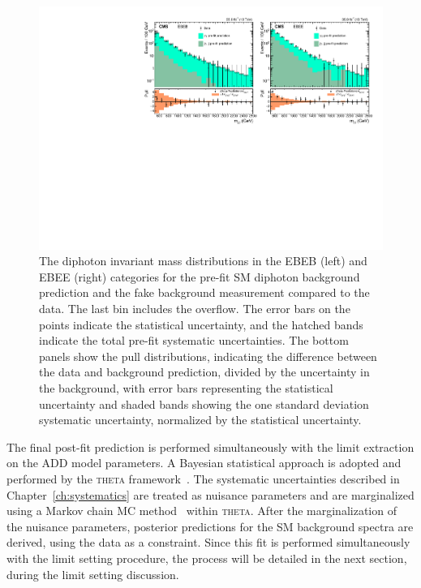 \begin{figure}[!htb]
  \centering
  \includegraphics[width=1.0\textwidth]{figures/PLOT_PRED_PULL_35p9_0.pdf}
  \caption{The diphoton invariant mass distributions in the EBEB (left) and EBEE (right) categories for the pre-fit SM diphoton background prediction and the fake background measurement compared to the data. The last bin includes the overflow. The error bars on the points indicate the statistical uncertainty, and the hatched bands indicate the total pre-fit systematic uncertainties. The bottom panels show the pull distributions, indicating the difference between the data and background prediction, divided by the uncertainty in the background, with error bars representing the statistical uncertainty and shaded bands showing the one standard deviation systematic uncertainty, normalized by the statistical uncertainty.}
  \label{fig:mgg_pre_fit}
\end{figure}

The final post-fit prediction is performed simultaneously with the limit extraction on the ADD model parameters. A Bayesian statistical approach is adopted and performed by the \textsc{theta} framework~\cite{theta}. The systematic uncertainties described in Chapter~\ref{ch:systematics} are treated as nuisance parameters and are marginalized using a Markov chain MC method~\cite{Metropolis:1953am} within \textsc{theta}. After the marginalization of the nuisance parameters, posterior predictions for the SM background \mgg spectra are derived, using the data as a constraint. Since this fit is performed simultaneously with the limit setting procedure, the process will be detailed in the next section, during the limit setting discussion.

